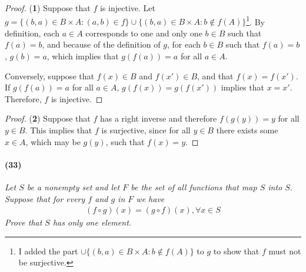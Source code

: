 \begin{proof}(\textbf{1})
	Suppose that $f$ is injective. Let $g = \{(b,a)\in B\times A:(a,b)\in f\}\cup\{(b,a)\in B\times A:b\notin f(A)\}$\footnote{I added the part $\cup\{(b,a)\in B\times A:b\notin f(A)\}$ to $g$ to show that $f$ must not be surjective.}. By definition, each $a\in A$ corresponds to one and only one $b\in B$ such that $f(a)=b$, and because of the definition of $g$, for each $b\in B$ such that $f(a)=b$, $g(b)=a$, which implies that $g(f(a))=a$ for all $a\in A$. 
	
	Conversely, suppose that $f(x)\in B$ and $f(x')\in B$, and that $f(x)=f(x')$. If $g(f(a))=a$ for all $a\in A$, $g(f(x))=g(f(x'))$ implies that $x=x'$. Therefore, $f$ is injective.
\end{proof}

\begin{proof}(\textbf{2})
	Suppose that $f$ has a right inverse and therefore $f(g(y))=y$ for all $y\in B$. This implies that $f$ is surjective, since for all $y\in B$ there exists some $x\in A$, which may be $g(y)$, such that $f(x)=y$.
\end{proof}

\newpage
\paragraph{(33)}

\textit{Let $S$ be a nonempty set and let $F$ be the set of all functions that map $S$ into $S$. Suppose that for every $f$ and $g$ in $F$ we have
\begin{align*}
	(f\circ g)(x)=(g\circ f)(x), \forall x\in S
\end{align*}
Prove that $S$ has only one element.}


